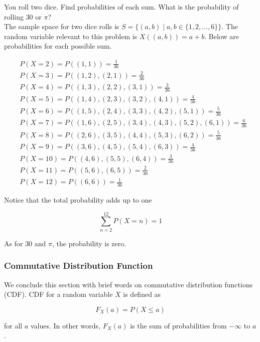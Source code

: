 \begin{texample}
	You roll two dice. Find probabilities of each sum. What is the probability of rolling $30$ or $\pi$? \\
	
	The sample space for two dice rolls is $S=\{(a,b) \mid a,b \in \{1, 2, \dots, 6\}\}$. The random variable relevant to this problem is $X((a,b))=a+b$. Below are probabilities for each possible sum.
	
	\begin{align*}
		&P(X = 2) = P((1, 1)) = \frac{1}{36} \\
		&P(X = 3) = P((1, 2), (2, 1)) = \frac{2}{36} \\
		&P(X = 4) = P((1, 3), (2, 2), (3, 1)) = \frac{3}{36} \\
		&P(X = 5) = P((1, 4), (2, 3), (3, 2), (4, 1)) = \frac{4}{36} \\
		&P(X = 6) = P((1, 5), (2, 4), (3, 3), (4, 2), (5, 1)) = \frac{5}{36} \\
		&P(X = 7) = P((1, 6), (2, 5), (3, 4), (4, 3), (5, 2), (6, 1)) = \frac{6}{36} \\
		&P(X = 8) = P((2, 6), (3, 5), (4, 4), (5, 3), (6, 2)) = \frac{5}{36} \\
		&P(X = 9) = P((3, 6), (4, 5), (5, 4), (6, 3)) = \frac{4}{36} \\
		&P(X = 10) = P((4, 6), (5, 5), (6, 4)) = \frac{3}{36} \\
		&P(X = 11) = P((5, 6), (6, 5)) = \frac{2}{36} \\
		&P(X = 12) = P((6, 6)) = \frac{1}{36}
	\end{align*}
	
	Notice that the total probability adds up to one
	
	$$\sum_{n=2}^{12} P(X=n)=1$$
	
	As for $30$ and $\pi$, the probability is zero.
\end{texample}

\subsubsection{Commutative Distribution Function}

We conclude this section with brief words on commutative distribution functions (CDF). CDF for a random variable $X$ is defined as

$$F_X (a)=P(X\le a)$$

for all $a$ values. In other words, $F_X(a)$ is the sum of probabilities from $-\infty$ to $a$. \\

